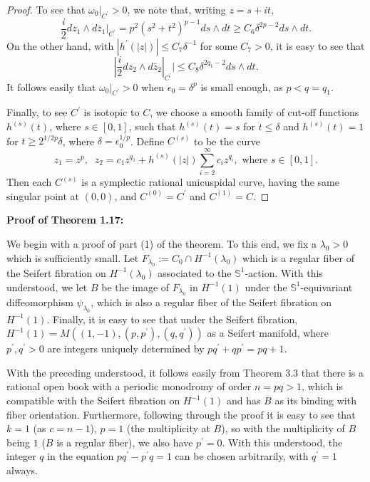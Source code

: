 \documentclass[11pt]{amsart}
\theoremstyle{plain}
\numberwithin{theorem}{section}
\theoremstyle{definition}
\newcommand{\s}{{\mathbb S}}
\begin{document}
\begin{proof}
To see that $\omega_0|_{C^\prime}>0$, we note that, writing $z=s+it$, 
$$
\frac{i}{2} dz_1\wedge d\bar{z}_1|_{C^\prime}=p^2 (s^2+t^2)^{p-1} ds\wedge dt\geq C_6\delta^{2p-2}
ds\wedge dt.
$$ 
On the other hand, with $|h^\prime(|z|)|\leq C_7 \delta^{-1}$ for some $C_7>0$, it is easy to see
that 
$$
|\frac{i}{2} dz_2\wedge d\bar{z}_2|_{C^\prime}|\leq C_8 \delta^{2q_1-2} ds\wedge dt.
$$
It follows easily that $\omega_0|_{C^\prime}>0$ when $\epsilon_0=\delta^p$ is small enough,
as $p<q=q_1$.

Finally, to see $C^\prime$ is isotopic to $C$, we choose a smooth family of cut-off functions $h^{(s)}(t)$, where 
$s\in [0,1]$, such that $h^{(s)}(t)=s$ for $t\leq \delta$ and $h^{(s)}(t)=1$ for $t\geq 2^{1/2p}\delta$, 
where $\delta=\epsilon_0^{1/p}$. Define $C^{(s)}$ to be the curve 
$$
z_1=z^p,\;\; z_2=c_1z^{q_1} +h^{(s)}(|z|) \sum_{i=2}^\infty c_i z^{q_i}, \mbox{ where } s\in [0,1]. 
$$
Then each $C^{(s)}$ is a symplectic rational unicuspidal curve, having the same singular point at $(0,0)$, and
$C^{(0)}=C^\prime$ and $C^{(1)} =C$.

\end{proof}

\vspace{3mm}

{\bf Proof of Theorem 1.17:}

\vspace{2mm}

We begin with a proof of part (1) of the theorem. To this end, we fix a $\lambda_0>0$ which is sufficiently small. 
Let $F_{\lambda_0}:=C_0\cap H^{-1}(\lambda_0)$ which is a regular fiber of the Seifert fibration on 
$H^{-1}(\lambda_0)$ associated to the $\s^1$-action. With this understood, we let $B$ be the 
image of $F_{\lambda_0}$ in $H^{-1}(1)$ under the $\s^1$-equivariant diffeomorphism 
$\psi_{\lambda_0}$, which is also a regular fiber of the Seifert fibration on $H^{-1}(1)$. Finally, it is easy to see
that under the Seifert fibration, $H^{-1}(1)=M((1,-1), (p,p^\prime),(q,q^\prime))$ as a Seifert manifold, where $p^\prime,
q^\prime>0$ are integers uniquely determined by $pq^\prime+qp^\prime=pq+1$.

With the preceding understood, it follows easily from Theorem 3.3 that there is a rational open book with a periodic monodromy of order $n=pq>1$, which is compatible with the Seifert fibration on $H^{-1}(1)$ and has $B$ as its binding with fiber orientation. Furthermore, following through the proof it is easy to see that $k=1$ (as $c=n-1$), $p=1$ (the multiplicity at $B$), so with the multiplicity of $B$ being $1$ ($B$ is a regular fiber), we also have
$p^\prime=0$. With this understood, the integer $q$ in the equation $pq^\prime-p^\prime q=1$ can be chosen arbitrarily, with $q^\prime=1$ always. 
\end{document}
